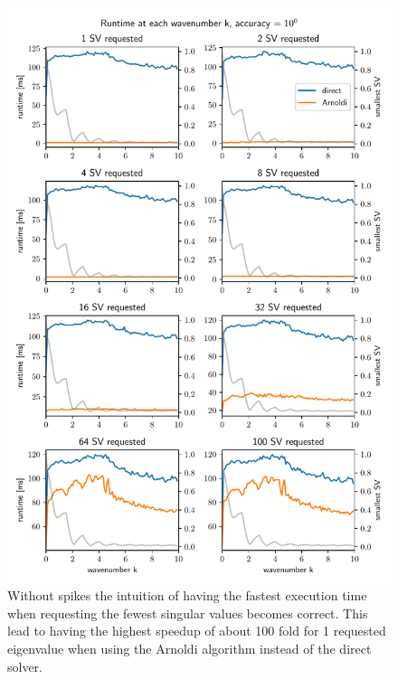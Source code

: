 \documentclass[a4paper, oneside]{discothesis}
\begin{document}
\begin{figure} [H]
	\centering
	\includegraphics[width=\columnwidth]{figures/arnoldi_time_1e2.pdf}
	\caption{
		Without spikes the intuition of having the fastest execution time when requesting the fewest singular values becomes correct.
		This lead to having the highest speedup of about 100 fold for 1 requested eigenvalue when using the Arnoldi algorithm instead of the direct solver.
	}
	\label{fig:arnoldi_time_1e2}
\end{figure}
\end{document}

